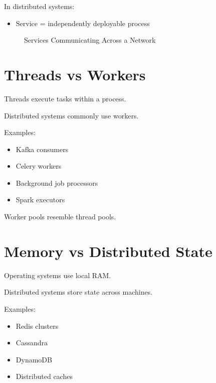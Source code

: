 In distributed systems:

\begin{itemize}
\item Service = independently deployable process
\end{itemize}

\begin{figure}[H]
\centering
{}
\caption{Services Communicating Across a Network}
\end{figure}

\section{Threads vs Workers}

Threads execute tasks within a process.

Distributed systems commonly use workers.

Examples:

\begin{itemize}
\item Kafka consumers
\item Celery workers
\item Background job processors
\item Spark executors
\end{itemize}

Worker pools resemble thread pools.

\section{Memory vs Distributed State}

Operating systems use local RAM.

Distributed systems store state across machines.

Examples:

\begin{itemize}
\item Redis clusters
\item Cassandra
\item DynamoDB
\item Distributed caches
\end{itemize}

